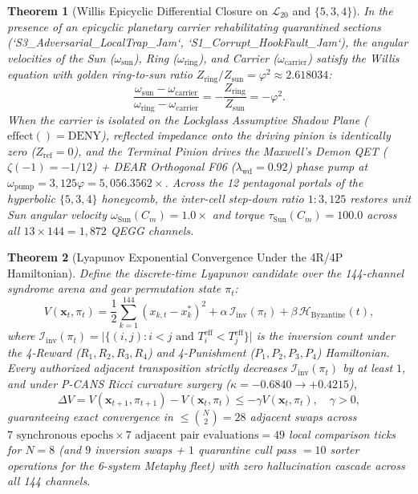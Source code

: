 \documentclass[11pt,a4paper]{article}
\newtheorem{theorem}{Theorem}[section]
\begin{document}
\begin{theorem}[Willis Epicyclic Differential Closure on $\mathcal{L}_{20}$ and $\{5,3,4\}$]
In the presence of an epicyclic planetary carrier rehabilitating quarantined sections (`S3_Adversarial_LocalTrap_Jam`, `S1_Corrupt_HookFault_Jam`), the angular velocities of the Sun ($\omega_{\text{sun}}$), Ring ($\omega_{\text{ring}}$), and Carrier ($\omega_{\text{carrier}}$) satisfy the Willis equation with golden ring-to-sun ratio $Z_{\text{ring}} / Z_{\text{sun}} = \varphi^2 \approx 2.618034$:
\begin{equation}
\frac{\omega_{\text{sun}} - \omega_{\text{carrier}}}{\omega_{\text{ring}} - \omega_{\text{carrier}}} = -\frac{Z_{\text{ring}}}{Z_{\text{sun}}} = -\varphi^2.
\end{equation}
When the carrier is isolated on the Lockglass Assumptive Shadow Plane ($\text{effect}() = \text{DENY}$), reflected impedance onto the driving pinion is identically zero ($Z_{\text{ref}} = 0$), and the Terminal Pinion drives the Maxwell's Demon QET ($\zeta(-1) = -1/12$) + DEAR Orthogonal F06 ($\lambda_{\text{wd}} = 0.92$) phase pump at $\omega_{\text{pump}} = 3{,}125\varphi = 5{,}056.3562\times$. Across the 12 pentagonal portals of the hyperbolic $\{5,3,4\}$ honeycomb, the inter-cell step-down ratio $1 : 3{,}125$ restores unit Sun angular velocity $\omega_{\text{Sun}}(C_m) = 1.0\times$ and torque $\tau_{\text{Sun}}(C_m) = 100.0$ across all $13 \times 144 = 1{,}872$ QEGG channels.
\end{theorem}

\begin{theorem}[Lyapunov Exponential Convergence Under the 4R/4P Hamiltonian]
Define the discrete-time Lyapunov candidate over the 144-channel syndrome arena and gear permutation state $\pi_t$:
\begin{equation}
V(\mathbf{x}_t, \pi_t) = \frac{1}{2} \sum_{k=1}^{144} (x_{k,t} - x^*_k)^2 + \alpha \, \mathcal{I}_{\text{inv}}(\pi_t) + \beta \, \mathcal{H}_{\text{Byzantine}}(t),
\end{equation}
where $\mathcal{I}_{\text{inv}}(\pi_t) = \lvert\{(i,j) : i < j \text{ and } T_i^{\text{eff}} < T_j^{\text{eff}}\}\rvert$ is the inversion count under the 4-Reward ($R_1, R_2, R_3, R_4$) and 4-Punishment ($P_1, P_2, P_3, P_4$) Hamiltonian. Every authorized adjacent transposition strictly decreases $\mathcal{I}_{\text{inv}}(\pi_t)$ by at least $1$, and under P-CANS Ricci curvature surgery ($\kappa = -0.6840 \to +0.4215$),
\begin{equation}
\Delta V = V(\mathbf{x}_{t+1}, \pi_{t+1}) - V(\mathbf{x}_t, \pi_t) \le -\gamma V(\mathbf{x}_t, \pi_t), \quad \gamma > 0,
\end{equation}
guaranteeing exact convergence in $\le \binom{N}{2} = 28$ adjacent swaps across $7\text{ synchronous epochs} \times 7\text{ adjacent pair evaluations} = 49$ local comparison ticks for $N=8$ (and $9$ inversion swaps + $1$ quarantine cull pass $= 10$ sorter operations for the 6-system Metaphy fleet) with zero hallucination cascade across all 144 channels.
\end{theorem}
\end{document}
